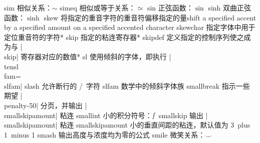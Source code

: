 \capcs sim {相似关系：$\sim$}{}{}
\capcs simeq {相似或等于关系：$\simeq$}{}{}
\capcs sin {正弦函数：$\sin$}{}{}
\capcs sinh {双曲正弦函数：$\sinh$}{}{}
\capcs skew {将指定的重音字符的重音符偏移指定的量shift a specified accent by a specified amount on a specified accented character}{}{}
\capcs skewchar {指定字体中用于定位重音符的字符}*{}
\capcs skip {指定的粘连寄存器}*{}
\capcs skipdef {定义指定的控制序列使之成为与 |\\skip| 寄存器对应的数值}*{}
\capcs sl {使用倾斜的字体，即执行 |\\tensl\\fam=\\slfam|}{}{}
\capcs slash {允许断行的 \slash\ 字符}{}{}
\capcs slfam {数学中的倾斜字体族}{}{}
\capcs smallbreak {指示一些期望 |\\penalty-50| 分页，并输出 |\\smallskipamount| 粘连}{}{}
\capcs smallint {小的积分符号：$\smallint$}{}{}
\capcs smallskip {输出 |\\smallskipamount| 粘连}{}{}
\capcs smallskipamount {小的垂直间距的粘连，默认值为 3\pt\ plus 1\pt\ minus 1\pt}{}{}
\capcs smash {输出高度与浓度均为零的公式}{}{}
\capcs smile {微笑关系：$\smile$}{}{}
